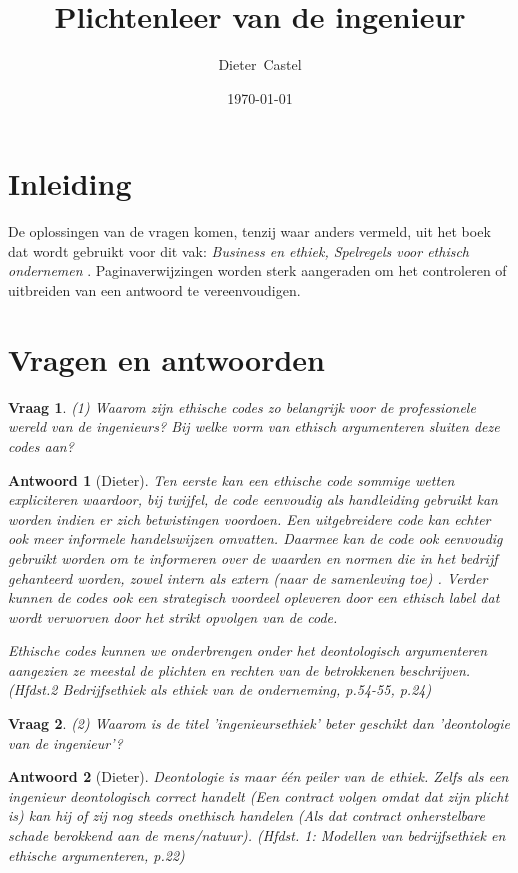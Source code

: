 \documentclass{article}
\title{Plichtenleer van de ingenieur}
\date{\today}
\author{Dieter~Castel}
\theoremstyle{nonumberplain}
\newtheorem{question}{Vraag}
\newtheorem{answer}{Antwoord}
\begin{document}
\maketitle
\tableofcontents
\newpage

\section{Inleiding}
De oplossingen van de vragen komen, tenzij waar anders vermeld, uit het boek dat wordt gebruikt voor dit vak: \textit{Business en ethiek, Spelregels voor ethisch ondernemen} \cite{gerwen2002business}. Paginaverwijzingen worden sterk aangeraden om het controleren of uitbreiden van een antwoord te vereenvoudigen.

\section{Vragen en antwoorden}

\begin{question}
(1)	Waarom zijn ethische codes zo belangrijk voor de professionele wereld van de ingenieurs? Bij welke vorm van ethisch argumenteren sluiten deze codes aan? 
\end{question}
\begin{answer}[Dieter]
	Ten eerste kan een ethische code sommige wetten expliciteren waardoor, bij twijfel, de code eenvoudig als handleiding gebruikt kan worden indien er zich betwistingen voordoen.
	Een uitgebreidere code kan echter ook meer informele handelswijzen omvatten.
	Daarmee kan de code ook eenvoudig gebruikt worden om te informeren over de waarden en normen die in het bedrijf gehanteerd worden, zowel intern als extern (naar de samenleving toe) .
	Verder kunnen de codes ook een strategisch voordeel opleveren door een ethisch label dat wordt verworven door het strikt opvolgen van de code.

	Ethische codes kunnen we onderbrengen onder het deontologisch argumenteren aangezien ze meestal de plichten en rechten van de betrokkenen beschrijven.
	(Hfdst.2 Bedrijfsethiek als ethiek van de onderneming, p.54-55, p.24)
\end{answer}

\begin{question}
(2)	Waarom is de titel 'ingenieursethiek' beter geschikt dan 'deontologie van de ingenieur'?
\end{question}
\begin{answer}[Dieter]
	Deontologie is maar \'e\'en peiler van de ethiek. Zelfs als een ingenieur deontologisch correct handelt (Een contract volgen omdat dat zijn plicht is) kan hij of zij nog steeds onethisch handelen (Als dat contract onherstelbare schade berokkend aan de mens/natuur).
	\textit{(Hfdst. 1: Modellen van bedrijfsethiek en ethische argumenteren, p.22)}
\end{answer}
\end{document}
